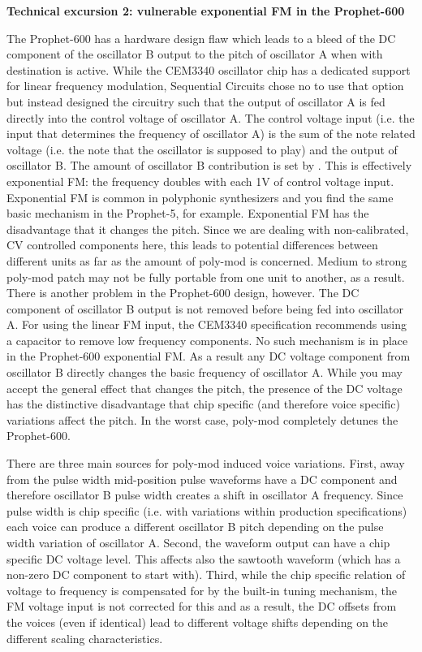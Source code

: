 \textbf{Technical excursion 2: vulnerable exponential FM in the Prophet-600}

The Prophet-600 has a hardware design flaw which leads to a bleed of the DC component of the oscillator B output to the pitch of oscillator A when \polymodosc with destination \polymodfreq is active. While the CEM3340 oscillator chip has a dedicated support for linear frequency modulation, Sequential Circuits chose no to use that option but instead designed the circuitry such that the output of oscillator A is fed directly into the control voltage of oscillator A. The control voltage input (i.e. the input that determines the frequency of oscillator A) is the sum of the note related voltage (i.e. the note that the oscillator is supposed to play) and the output of oscillator B. The amount of oscillator B contribution is set by \polymodosc. This is effectively exponential FM: the frequency doubles with each 1V of control voltage input. Exponential FM is common in polyphonic synthesizers and you find the same basic mechanism in the Prophet-5, for example. Exponential FM has the disadvantage that it changes the pitch. Since we are dealing with non-calibrated, CV controlled components here, this leads to potential differences between different units as far as the amount of poly-mod is concerned. Medium to strong poly-mod patch may not be fully portable from one unit to another, as a result. There is another problem in the Prophet-600 design, however. The DC component of oscillator B output is not removed before being fed into oscillator A. For using the linear FM input, the CEM3340 specification recommends using a capacitor to remove low frequency components. No such mechanism is in place in the Prophet-600 exponential FM. As a result any DC voltage component from oscillator B directly changes the basic frequency of oscillator A. While you may accept the general effect that \polymodosc changes the pitch, the presence of the DC voltage has the distinctive disadvantage that chip specific (and therefore voice specific) variations affect the pitch. In the worst case, poly-mod completely detunes the Prophet-600. 

There are three main sources for poly-mod induced voice variations. First, away from the pulse width mid-position pulse waveforms have a DC component and therefore oscillator B pulse width creates a shift in oscillator A frequency. Since pulse width is chip specific (i.e. with variations within production specifications) each voice can produce a different oscillator B pitch depending on the pulse width variation of oscillator A. Second, the waveform output can have a chip specific DC voltage level. This affects also the sawtooth waveform (which has a non-zero DC component to start with). Third, while the chip specific relation of voltage to frequency is compensated for by the built-in tuning mechanism, the FM voltage input is not corrected for this and as a result, the DC offsets from the voices (even if identical) lead to different voltage shifts depending on the different scaling characteristics. 

